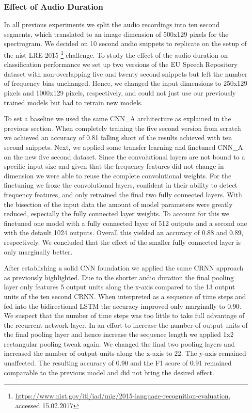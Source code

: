 \subsubsection{Effect of Audio Duration} 
\label{sec:duration}
In all previous experiments we split the audio recordings into ten second segments, which translated to an image dimension of 500x129 pixels for the spectrogram. We decided on 10 second audio snippets to replicate on the setup of the \ac{nist} LRE 2015 \footnote{\url{https://www.nist.gov/itl/iad/mig/2015-language-recognition-evaluation}, accessed 15.02.2017} challenge. To study the effect of the audio duration on classification performance we set up two versions of the EU Speech Repository dataset with non-overlapping five and twenty second snippets but left the number of frequency bins unchanged. Hence, we changed the input dimensions to 250x129 pixels and 1000x129 pixels, respectively, and could not just use our previously trained models but had to retrain new models.

To set a baseline we used the same CNN\_A architecture as explained in the previous section. When completely training the five second version from scratch we achieved an accuracy of 0.81 falling short of the results achieved with ten second snippets. Next, we applied some transfer learning and finetuned CNN\_A on the new five second dataset. Since the convolutional layers are not bound to a specific input size and given that the frequency features did not change in dimension we were able to reuse the complete  convolutional weights. For the finetuning we froze the convolutional layers, confident in their ability to detect frequency features, and only retrained the final two fully connected layers. With the bisection of the input data the amount of model parameters were greatly reduced, especially the fully connected layer weights. To account for this we finetuned one model with a fully connected layer of 512 outputs and a second one with the default 1024 outputs. Overall this yielded an accuracy of 0.88 and 0.89, respectively. We concluded that the effect of the smaller fully connected layer is only marginally better. 

After establishing a solid CNN foundation we applied the same CRNN approach as previously highlighted. Due to the shorter audio duration the final pooling layer only features 5 output units along the x-axis compared to the 13 output units of the ten second CRNN. When interpreted as a sequence of time steps and fed into the bidirectional LSTM the accuracy improved only marginally to 0.90. We suspect that the number of time steps was too little to take full advantage of the recurrent network layer.
In an effort to increase the number of output units of the final pooling layer and hence increase the sequence length we applied 1x2 rectangular pooling tweak again. We changed the final two pooling layers and increased the number of output units along the x-axis to 22. The y-axis remained unaffected. The resulting accuracy of 0.90 and the F1 score of 0.91 remained comparable to the previous model and did not bring the desired effect. 

